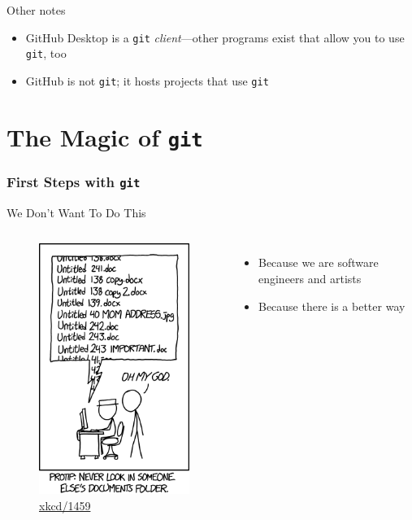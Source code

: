 \documentclass{beamer}
\theoremstyle{example}
\newcommand{\xkcd}[1]{\href{https://xkcd.com/#1}{xkcd/#1}}
\begin{document}
\begin{frame}{Other notes}
    \begin{itemize}
        \item GitHub Desktop is a \texttt{git} \emph{client}---other programs
            exist that allow you to use \texttt{git}, too
        \item GitHub is not \texttt{git}; it hosts projects that use
            \texttt{git}
    \end{itemize}
\end{frame}

\part{The Magic of \texttt{git}}
\frame{\partpage}
\frame{\tableofcontents[part=2]}

\section{First Steps with \texttt{git}}
\begin{frame}{We Don't Want To Do This}
    \begin{columns}
        \begin{figure}
            \includegraphics[scale=0.4]{img/documents}
            \caption{\xkcd{1459}}
        \end{figure}

        \begin{itemize}
            \item Because we are software engineers and artists
            \item Because there is a better way
        \end{itemize}
    \end{columns}
\end{frame}
\end{document}
